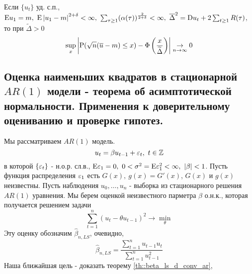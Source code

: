 \begin{corollary}
    Если $\{u_t\}$ уд. с.п., $\E u_1=m,\ \E\left\lvert u_1-m\right\rvert ^{2+\delta}<\infty,\ \sum_{\tau\geq1}(\alpha(\tau))^{\frac{2}{2+\delta}}<\infty,\ \overline{\Delta}^2=\D u_t+2\sum_{t\geq1}R(\tau)$,
    то при  $\widetilde{\Delta}>0$
    \[\sup_{x}\left\lvert \P(\sqrt{n}(\overline{u}-m)\leq x)-\Phi\left(\frac{x}{\widetilde{\Delta}}\right)\right\rvert \underset{n\rightarrow\infty}{\rightarrow}0\]
\end{corollary}

\newpage
\subsection{Оценка наименьших квадратов в стационарной $AR(1)$ модели - теорема об
асимптотической нормальности. Применения к доверительному оцениванию и проверке гипотез.}
Мы рассматриваем $AR(1)$ модель.
\begin{equation} \label{eq::new_ar_equation}
    u_t=\beta u_{t-1}+\eps_t,\ t\in\Z
\end{equation}
в которой $\{\eps_t\}$ - н.о.р. сл.в., $\E\eps_1=0,\ 0<\sigma^2=\E\eps_1^2<\infty,\ \left\lvert \beta\right\rvert <1$.
Пусть функция распределения $\eps_1$ есть $G(x),\ g(x)=G'(x)$, $G(x)$ и $g(x)$ неизвестны.
Пусть наблюдения $u_0,\ldots,u_n$ - выборка из стационарного решения $AR(1)$ уравнения.
Мы берем оценкой неизвестного парметра $\beta$ о.н.к., которая получается решением задачи
\[\sum_{t=1}^n(u_t-\theta u_{t-1})^2\rightarrow\min_{\theta}\]
Эту оценку обозначим $\widehat{\beta}_{n,LS}$, очевидно,
\begin{equation} \label{eq::ls_frac_repr} \tag{18'}
    \widehat{\beta}_{n,LS}=\frac{\sum_{t=1}^nu_{t-1}u_t}{\sum_{t=1}^nu_{t-1}^2}
\end{equation}
Наша ближайшая цель - доказать теорему \ref{th::beta_ls_d_conv_ar},

